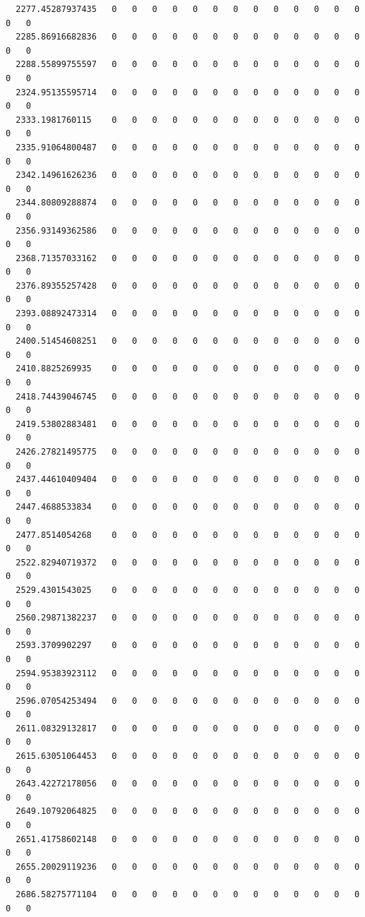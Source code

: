 \documentclass[
  letterpaper,
  DIV=11,
  numbers=noendperiod]{scrartcl}
\begin{document}
\begin{verbatim}
  2277.45287937435   0   0   0   0   0   0   0   0   0   0   0   0   0   0   0
  2285.86916682836   0   0   0   0   0   0   0   0   0   0   0   0   0   0   0
  2288.55899755597   0   0   0   0   0   0   0   0   0   0   0   0   0   0   0
  2324.95135595714   0   0   0   0   0   0   0   0   0   0   0   0   0   0   0
  2333.1981760115    0   0   0   0   0   0   0   0   0   0   0   0   0   0   0
  2335.91064800487   0   0   0   0   0   0   0   0   0   0   0   0   0   0   0
  2342.14961626236   0   0   0   0   0   0   0   0   0   0   0   0   0   0   0
  2344.80809288874   0   0   0   0   0   0   0   0   0   0   0   0   0   0   0
  2356.93149362586   0   0   0   0   0   0   0   0   0   0   0   0   0   0   0
  2368.71357033162   0   0   0   0   0   0   0   0   0   0   0   0   0   0   0
  2376.89355257428   0   0   0   0   0   0   0   0   0   0   0   0   0   0   0
  2393.08892473314   0   0   0   0   0   0   0   0   0   0   0   0   0   0   0
  2400.51454608251   0   0   0   0   0   0   0   0   0   0   0   0   0   0   0
  2410.8825269935    0   0   0   0   0   0   0   0   0   0   0   0   0   0   0
  2418.74439046745   0   0   0   0   0   0   0   0   0   0   0   0   0   0   0
  2419.53802883481   0   0   0   0   0   0   0   0   0   0   0   0   0   0   0
  2426.27821495775   0   0   0   0   0   0   0   0   0   0   0   0   0   0   0
  2437.44610409404   0   0   0   0   0   0   0   0   0   0   0   0   0   0   0
  2447.4688533834    0   0   0   0   0   0   0   0   0   0   0   0   0   0   0
  2477.8514054268    0   0   0   0   0   0   0   0   0   0   0   0   0   0   0
  2522.82940719372   0   0   0   0   0   0   0   0   0   0   0   0   0   0   0
  2529.4301543025    0   0   0   0   0   0   0   0   0   0   0   0   0   0   0
  2560.29871382237   0   0   0   0   0   0   0   0   0   0   0   0   0   0   0
  2593.3709902297    0   0   0   0   0   0   0   0   0   0   0   0   0   0   0
  2594.95383923112   0   0   0   0   0   0   0   0   0   0   0   0   0   0   0
  2596.07054253494   0   0   0   0   0   0   0   0   0   0   0   0   0   0   0
  2611.08329132817   0   0   0   0   0   0   0   0   0   0   0   0   0   0   0
  2615.63051064453   0   0   0   0   0   0   0   0   0   0   0   0   0   0   0
  2643.42272178056   0   0   0   0   0   0   0   0   0   0   0   0   0   0   0
  2649.10792064825   0   0   0   0   0   0   0   0   0   0   0   0   0   0   0
  2651.41758602148   0   0   0   0   0   0   0   0   0   0   0   0   0   0   0
  2655.20029119236   0   0   0   0   0   0   0   0   0   0   0   0   0   0   0
  2686.58275771104   0   0   0   0   0   0   0   0   0   0   0   0   0   0   0

\end{verbatim}
\end{document}
